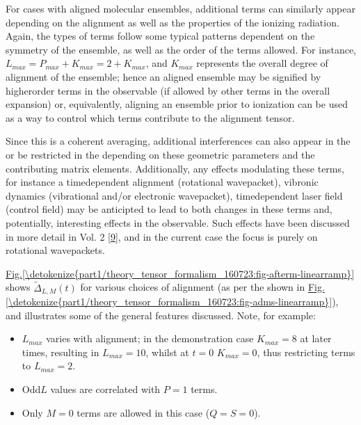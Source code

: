 \documentclass[letterpaper,table,10pt,english]{jupyterBook}
\begin{document}
\sphinxAtStartPar
For cases with aligned molecular ensembles, additional terms can similarly appear depending on the alignment as well as the properties of the ionizing radiation. Again, the types of terms follow some typical patterns dependent on the symmetry of the ensemble, as well as the order of the terms allowed. For instance, \(L_{max}=P_{max}+K_{max}=2+K_{max}\), and \(K_{max}\) represents the overall degree of alignment of the ensemble; hence an aligned ensemble may be signified by higher\sphinxhyphen{}order terms in the observable (if allowed by other terms in the overall expansion) or, equivalently, aligning an ensemble prior to ionization can be used as a way to control which terms contribute to the alignment tensor.

\sphinxAtStartPar
Since this is a coherent averaging, additional interferences can also appear in the {\hyperref[\detokenize{backmatter/glossary:term-AF}]{}} \sphinxhyphen{} or be restricted in the {\hyperref[\detokenize{backmatter/glossary:term-AF}]{}} \sphinxhyphen{} depending on these geometric parameters and the contributing matrix elements. Additionally, any effects modulating these terms, for instance a time\sphinxhyphen{}dependent alignment (rotational wavepacket), vibronic dynamics (vibrational and/or electronic wavepacket), time\sphinxhyphen{}dependent laser field (control field) may be anticipted to lead to both changes in these terms and, potentially, interesting effects in the observable. Such effects have been discussed in more detail in  Vol. 2 {[}\hyperlink{cite.backmatter/bibliography:id676}{9}{]}, and in the current case the focus is purely on rotational wavepackets.

\sphinxAtStartPar
\hyperref[\detokenize{part1/theory_tensor_formalism_160723:fig-afterm-linearramp}]{Fig.\@ \ref{\detokenize{part1/theory_tensor_formalism_160723:fig-afterm-linearramp}}} shows \(\tilde{\Delta}_{L,M}(t)\) for various choices of alignment (as per the {\hyperref[\detokenize{backmatter/glossary:term-ADMs}]{}} shown in \hyperref[\detokenize{part1/theory_tensor_formalism_160723:fig-adms-linearramp}]{Fig.\@ \ref{\detokenize{part1/theory_tensor_formalism_160723:fig-adms-linearramp}}}), and illustrates some of the general features discussed. Note, for example:
\begin{itemize}
\item {} 
\sphinxAtStartPar
\(L_{max}\) varies with alignment; in the demonstration case \(K_{max}=8\) at later times, resulting in \(L_{max}=10\), whilst at \(t=0\) \(K_{max}=0\), thus restricting terms to \(L_{max}=2\).

\item {} 
\sphinxAtStartPar
Odd\sphinxhyphen{}\(L\) values are correlated with \(P=1\) terms.

\item {} 
\sphinxAtStartPar
Only \(M=0\) terms are allowed in this case (\(Q=S=0\)).

\end{itemize}
\end{document}
